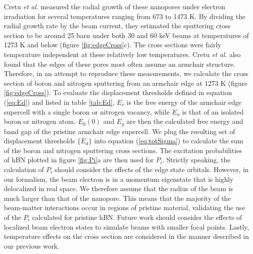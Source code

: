 \documentclass{article}
\begin{document}
Cretu \textit{et al.} measured the radial growth of these nanopores under electron
irradiation for several temperatures ranging from 673 to 1473 K.
\cite{Cretu2015}
By dividing the radial growth rate by the beam current, they estimated the
sputtering cross section to be around 25 barn under both 30 and 60 keV beams at
temperatures of 1273 K and below (figure \ref{fig:edgeCross}c).
The cross sections were fairly temperature independent at these relatively low
temperatures.
Cretu \textit{et al.} also found that the edges of these pores most often assume an
armchair structure.
Therefore, in an attempt to reproduce these measurements, we calculate the
cross section of boron and nitrogen sputtering from an armchair edge at 1273 K
(figure \ref{fig:edgeCross}).
To evaluate the displacement thresholds defined in equation (\ref{eq:Ed}) and
listed in table \ref{tab:Ed}, $E_v$ is the free energy of the armchair edge
supercell with a single boron or nitrogen vacancy, while $E_a$ is that of an
isolated boron or nitrogen atom.
$E_0(0)$ and $E_g$ are then the calculated free energy and band gap of the
pristine armchair edge supercell.
We plug the resulting set of displacement thresholds $\{E_d\}$ into equation
(\ref{eq:totSigma}) to calculate the sum of the boron and nitrogen sputtering
cross sections.
The excitation probabilities of hBN plotted in figure \ref{fig:Pi}a are
then used for $P_i$.
Strictly speaking, the calculation of $P_i$ should consider the effects of the
edge state orbitals.
However, in our formalism, the beam electron is in a momentum eigenstate that
is highly delocalized in real space.
We therefore assume that the radius of the beam is much larger than that of the
nanopore.
This means that the majority of the beam-matter interactions occur in regions
of pristine material, validating the use of the $P_i$ calculated for pristine
hBN.
Future work should consider the effects of localized beam electron states to
simulate beams with smaller focal points.
Lastly, temperature effects on the cross section are considered in the manner
described in our previous work.\cite{Yoshimura2018}
\end{document}
